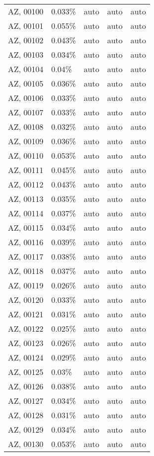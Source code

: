 \begin{longtable}[]{@{}lllll@{}}
AZ, 00100 & 0.033\% & auto & auto & auto \\
AZ, 00101 & 0.055\% & auto & auto & auto \\
AZ, 00102 & 0.043\% & auto & auto & auto \\
AZ, 00103 & 0.034\% & auto & auto & auto \\
AZ, 00104 & 0.04\% & auto & auto & auto \\
AZ, 00105 & 0.036\% & auto & auto & auto \\
AZ, 00106 & 0.033\% & auto & auto & auto \\
AZ, 00107 & 0.033\% & auto & auto & auto \\
AZ, 00108 & 0.032\% & auto & auto & auto \\
AZ, 00109 & 0.036\% & auto & auto & auto \\
AZ, 00110 & 0.053\% & auto & auto & auto \\
AZ, 00111 & 0.045\% & auto & auto & auto \\
AZ, 00112 & 0.043\% & auto & auto & auto \\
AZ, 00113 & 0.035\% & auto & auto & auto \\
AZ, 00114 & 0.037\% & auto & auto & auto \\
AZ, 00115 & 0.034\% & auto & auto & auto \\
AZ, 00116 & 0.039\% & auto & auto & auto \\
AZ, 00117 & 0.038\% & auto & auto & auto \\
AZ, 00118 & 0.037\% & auto & auto & auto \\
AZ, 00119 & 0.026\% & auto & auto & auto \\
AZ, 00120 & 0.033\% & auto & auto & auto \\
AZ, 00121 & 0.031\% & auto & auto & auto \\
AZ, 00122 & 0.025\% & auto & auto & auto \\
AZ, 00123 & 0.026\% & auto & auto & auto \\
AZ, 00124 & 0.029\% & auto & auto & auto \\
AZ, 00125 & 0.03\% & auto & auto & auto \\
AZ, 00126 & 0.038\% & auto & auto & auto \\
AZ, 00127 & 0.034\% & auto & auto & auto \\
AZ, 00128 & 0.031\% & auto & auto & auto \\
AZ, 00129 & 0.034\% & auto & auto & auto \\
AZ, 00130 & 0.053\% & auto & auto & auto \\

\end{longtable}
